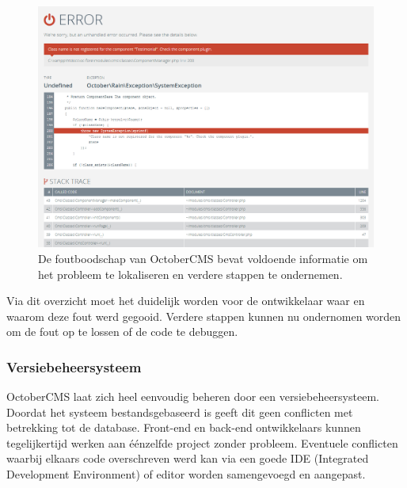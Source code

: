 \begin{figure}[!ht]
  \includegraphics[width=\textwidth]{img/oc-exeption.png}
  \caption{De foutboodschap van OctoberCMS bevat voldoende informatie om het probleem te lokaliseren en verdere stappen te ondernemen.}
  \label{fig:OctoberCMS exceptie.}
\end{figure}

\noindent
Via dit overzicht moet het duidelijk worden voor de ontwikkelaar waar en waarom deze fout werd gegooid. Verdere stappen kunnen nu ondernomen worden om de fout op te lossen of de code te debuggen. 

\subsubsection{Versiebeheersysteem}
OctoberCMS laat zich heel eenvoudig beheren door een versiebeheersysteem. Doordat het systeem bestandsgebaseerd is geeft dit geen conflicten met betrekking tot de database. Front-end en back-end ontwikkelaars kunnen tegelijkertijd werken aan éénzelfde project zonder probleem. Eventuele conflicten waarbij elkaars code overschreven werd kan via een goede IDE (Integrated Development Environment) of editor worden samengevoegd en aangepast.

